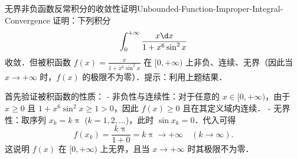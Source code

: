 \begin{problem}{无界非负函数反常积分的收敛性证明}{Unbounded-Function-Improper-Integral-Convergence}
    证明：下列积分
    \begin{equation}\label{eq:prob2-integral-1}
        \int_0^{+\infty} \frac{x \d x}{1 + x^6 \sin^2 x}
    \end{equation}
    收敛．但被积函数 $f(x) = \frac{x}{1+x^6 \sin^2 x}$ 在 $[0,+\infty)$ 上非负、连续、无界（因此当 $x \to +\infty$ 时，$f(x)$ 的极限不为零）．提示：利用上题结果．
\end{problem}

\begin{myproof}
    首先验证被积函数的性质：
    - 非负性与连续性：对于任意的 $x \in [0, +\infty)$，由于 $x \geqslant 0$ 且 $1 + x^6 \sin^2 x \geqslant 1 > 0$，因此 $f(x) \geqslant 0$ 且在其定义域内连续．
    - 无界性：取序列 $x_k = k\uppi$ ($k = 1, 2, \dots$)，此时 $\sin x_k = 0$．代入可得
    \begin{equation}\label{eq:unbounded-2}
        f(x_k) = \frac{k\uppi}{1 + 0} = k\uppi \to +\infty \quad (k \to \infty).
    \end{equation}
    这说明 $f(x)$ 在 $[0, +\infty)$ 上无界，且当 $x \to +\infty$ 时其极限不为零．


\end{myproof}
